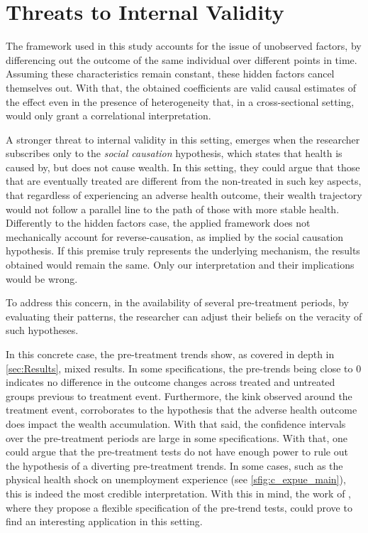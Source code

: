\section{Threats to Internal Validity}

The framework used in this study accounts for the issue of unobserved factors, by differencing out the outcome of
the same individual over different points in time. Assuming these characteristics remain constant, these hidden
factors cancel themselves out. With that, the obtained coefficients are valid causal estimates of the effect even
in the presence of heterogeneity that, in a cross-sectional setting, would only grant a correlational
interpretation.

A stronger threat to internal validity in this setting, emerges when the researcher subscribes only to the
\textit{social causation} hypothesis, which states that health is caused by, but does not cause wealth. In this
setting, they could argue that those that are eventually treated are different from the non-treated in such key
aspects, that regardless of experiencing an adverse health outcome, their wealth trajectory would not follow a
parallel line to the path of those with more stable health. Differently to the hidden factors case, the applied
framework does not mechanically account for reverse-causation, as implied by the social causation hypothesis. If
this premise truly represents the underlying mechanism, the results obtained would remain the same. Only our
interpretation and their implications would be wrong.

To address this concern, in the availability of several pre-treatment periods, by evaluating their patterns, 
the researcher can adjust their beliefs on the veracity of such hypotheses.  

In this concrete case, the pre-treatment trends show, as covered in depth in \cref{sec:Results}, mixed results. In
some specifications, the pre-trends being close to 0 indicates no difference in the outcome changes across treated
and untreated groups previous to treatment event. Furthermore, the kink observed around the treatment event,
corroborates to the hypothesis that the adverse health outcome does impact the wealth accumulation. With that said,
the confidence intervals over the pre-treatment periods are large in some specifications. With that, one could
argue that the pre-treatment tests do not have enough power to rule out the hypothesis of a diverting pre-treatment
trends. In some cases, such as the physical health shock on unemployment experience (see \cref{sfig:c_expue_main}),
this is indeed the most credible interpretation.  With this in mind, the work of \textcite{rambachan.roth2023more},
where they propose a flexible specification of the pre-trend tests, could prove to find an interesting application
in this setting.

